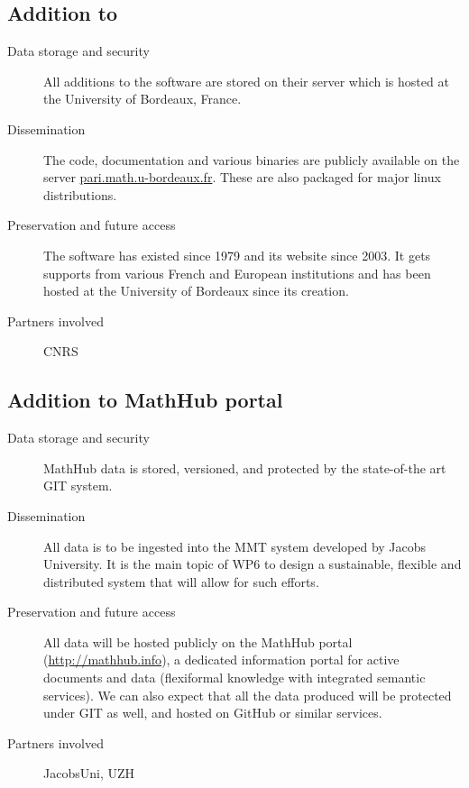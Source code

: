 \documentclass{../../Proposal/LaTeX-proposal/deliverablereport}
\begin{document}
\subsection{Addition to \PariGP}

\begin{description}
\item[Data storage and security] All additions to the \PariGP software are stored on their server which is hosted at the University of Bordeaux, France.
\item[Dissemination] The \PariGP code, documentation and various binaries are publicly available on the server \href{http://pari.math.u-bordeaux.fr/}{pari.math.u-bordeaux.fr}. These are also packaged for major linux distributions.
\item[Preservation and future access] The \PariGP software has existed
  since 1979 and its website since 2003. It gets supports from various
  French and European institutions and has been hosted at the University of Bordeaux since its creation.
\item[Partners involved] CNRS
\end{description}


\subsection{Addition to MathHub portal}


\begin{description}
\item[Data storage and security] MathHub data is stored, versioned, and protected by the
state-of-the art GIT system.
\item[Dissemination] All data is to be ingested into the MMT system developed by Jacobs University. It is the main topic of WP6 to design a sustainable, flexible and distributed system that will allow for such efforts.
\item[Preservation and future access] All data will be hosted publicly on the MathHub portal (\url{http://mathhub.info}), a
dedicated information portal for active documents and data (flexiformal knowledge with
integrated semantic services). We can also expect that all the data produced will be protected under GIT as well, and hosted on GitHub or similar services. 
\item[Partners involved] JacobsUni, UZH
\end{description}
\end{document}
